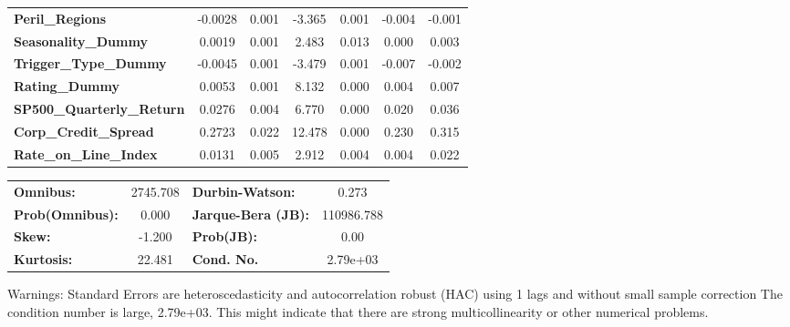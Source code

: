 \begin{center}
\begin{tabular}{lcccccc}
\textbf{Peril\_Regions}           &      -0.0028  &        0.001     &    -3.365  &         0.001        &       -0.004    &       -0.001     \\
\textbf{Seasonality\_Dummy}       &       0.0019  &        0.001     &     2.483  &         0.013        &        0.000    &        0.003     \\
\textbf{Trigger\_Type\_Dummy}     &      -0.0045  &        0.001     &    -3.479  &         0.001        &       -0.007    &       -0.002     \\
\textbf{Rating\_Dummy}            &       0.0053  &        0.001     &     8.132  &         0.000        &        0.004    &        0.007     \\
\textbf{SP500\_Quarterly\_Return} &       0.0276  &        0.004     &     6.770  &         0.000        &        0.020    &        0.036     \\
\textbf{Corp\_Credit\_Spread}     &       0.2723  &        0.022     &    12.478  &         0.000        &        0.230    &        0.315     \\
\textbf{Rate\_on\_Line\_Index}    &       0.0131  &        0.005     &     2.912  &         0.004        &        0.004    &        0.022     \\
\bottomrule
\end{tabular}
\begin{tabular}{lclc}
\textbf{Omnibus:}       & 2745.708 & \textbf{  Durbin-Watson:     } &     0.273   \\
\textbf{Prob(Omnibus):} &   0.000  & \textbf{  Jarque-Bera (JB):  } & 110986.788  \\
\textbf{Skew:}          &  -1.200  & \textbf{  Prob(JB):          } &      0.00   \\
\textbf{Kurtosis:}      &  22.481  & \textbf{  Cond. No.          } &  2.79e+03   \\
\bottomrule
\end{tabular}
\end{center}

Warnings: \newline
 [1] Standard Errors are heteroscedasticity and autocorrelation robust (HAC) using 1 lags and without small sample correction \newline
 [2] The condition number is large, 2.79e+03. This might indicate that there are \newline
 strong multicollinearity or other numerical problems.